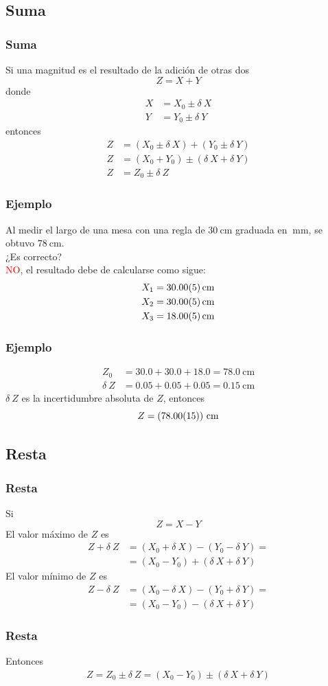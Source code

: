 \subsection*{Suma}
\begin{frame}
\frametitle{Suma}
Si una magnitud es el resultado de la adición de otras dos
\[ Z = X + Y \]
\pause
donde
\begin{align*}
X &= X_{0} \pm \delta \: X \\
Y &= Y_{0} \pm \delta \: Y
\end{align*}
\pause
entonces
\begin{align*}
Z &= (X_{0} \pm \delta \: X) + (Y_{0} \pm \delta \: Y) \\
Z &= (X_{0} + Y_{0}) \pm (\delta \: X + \delta \: Y) \\
Z &= Z_{0} \pm \delta \: Z
\end{align*}
\end{frame}
\begin{frame}
\frametitle{Ejemplo}
Al medir el largo de una mesa con una regla de $\SI{30}{\cm}$ graduada en $\SI{}{\mm}$, se obtuvo $\SI{78}{\cm}$.
\\
\bigskip
\pause
¿Es correcto?
\\
\bigskip
\pause
\textcolor{red}{NO}, el resultado debe de calcularse como sigue:
\begin{align*}
X_{1} &= \SI{30.0+-0.05}{\cm} \\
X_{2} &= \SI{30.0+-0.05}{\cm} \\
X_{3} &= \SI{18.0+-0.05}{\cm}
\end{align*}
\end{frame}
\begin{frame}
\frametitle{Ejemplo}
\begin{align*}
Z_{0} &= 30.0 + 30.0 + 18.0 = \SI{78.0}{\cm} \\
\delta \: Z &= 0.05 + 0.05 + 0.05 = \SI{0.15}{\cm}
\end{align*}
\pause
$\delta \: Z$ es la incertidumbre absoluta de $Z$, entonces
\[ Z = (\num{78.0+-0.15}) \mbox{ cm} \]
\end{frame}
\subsection*{Resta} 		
\begin{frame}
\frametitle{Resta}
Si
\[ Z = X- Y \]
\pause
El valor máximo de $Z$ es
\begin{align*}
Z + \delta \:Z &= (X_{0} + \delta \: X) - (Y_{0} - \delta \: Y) = \\
&= (X_{0} - Y_{0}) + (\delta \: X + \delta \: Y)
\end{align*}
\pause
El valor mínimo de $Z$ es
\begin{align*}
Z - \delta \: Z &= (X_{0} - \delta \: X) - (Y_{0} + \delta \: Y) = \\
&= (X_{0} - Y_{0}) - (\delta \: X + \delta \: Y)
\end{align*}
\end{frame}
\begin{frame}
\frametitle{Resta}
Entonces
\begin{align*}
Z = Z_{0} \pm \delta \: Z = (X_{0} - Y_{0}) \pm (\delta \: X + \delta \: Y)
\end{align*}
\end{frame}
